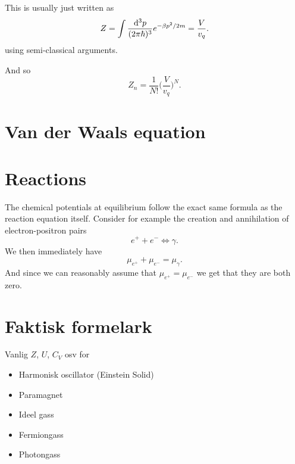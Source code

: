 \documentclass[a4paper, 11pt, notitlepage, english]{article}
\renewcommand{\d}{{\rm d}}
\begin{document}
This is usually just written as
$$Z = \int \frac{\d^3 p}{(2\pi \hbar)^3} e^{-\beta p^2/2m} = \frac{V}{v_q}.$$
using semi-classical arguments.

And so $$Z_n = \frac{1}{N!}\bigg(\frac{V}{v_q}\bigg)^N.$$

\section*{Van der Waals equation}


\section*{Reactions}

The chemical potentials at equilibrium follow the exact same formula as the reaction equation itself. Consider for example the creation and annihilation of electron-positron pairs
$$e^{+} + e^{-} \Leftrightarrow \gamma.$$
We then immediately have
$$\mu_{e^+} + \mu_{e^-} = \mu_\gamma.$$
And since we can reasonably assume that $\mu_{e^+} = \mu_{e^-}$ we get that they are both zero.  

\section*{Faktisk formelark}

Vanlig $Z$, $U$, $C_V$ osv for
\begin{itemize}
	\item Harmonisk oscillator (Einstein Solid)
	\item Paramagnet
	\item Ideel gass
	\item Fermiongass
	\item Photongass
\end{itemize}
\end{document}

